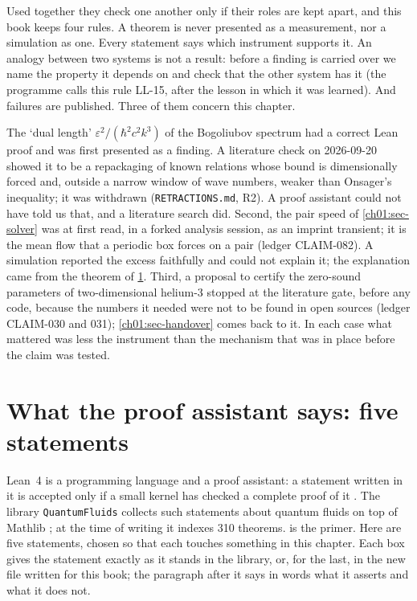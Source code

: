 Used together they check one another only if their roles are kept apart, and this book keeps four rules. A theorem is never presented as a measurement, nor a simulation as one. Every statement says which instrument supports it. An analogy between two systems is not a result: before a finding is carried over we name the property it depends on and check that the other system has it (the programme calls this rule LL-15, after the lesson in which it was learned). And failures are published. Three of them concern this chapter.

The `dual length' $\varepsilon^2/(\hbar^2c^2k^3)$ of the Bogoliubov spectrum had a correct Lean proof and was first presented as a finding. A literature check on 2026-09-20 showed it to be a repackaging of known relations whose bound is dimensionally forced and, outside a narrow window of wave numbers, weaker than Onsager's inequality; it was withdrawn (\texttt{RETRACTIONS.md}, R2). A proof assistant could not have told us that, and a literature search did. Second, the pair speed of \cref{ch01:sec-solver} was at first read, in a forked analysis session, as an imprint transient; it is the mean flow that a periodic box forces on a pair (ledger CLAIM-082). A simulation reported the excess faithfully and could not explain it; the explanation came from the theorem of \cref{ch01:sec-proof}. Third, a proposal to certify the zero-sound parameters of two-dimensional helium-3 stopped at the literature gate, before any code, because the numbers it needed were not to be found in open sources (ledger CLAIM-030 and 031); \cref{ch01:sec-handover} comes back to it. In each case what mattered was less the instrument than the mechanism that was in place before the claim was tested.

\section{What the proof assistant says: five statements}\label{ch01:sec-proof}

Lean~4 is a programming language and a proof assistant: a statement written in it is accepted only if a small kernel has checked a complete proof of it \cite{deMoura2021}. The library \texttt{QuantumFluids} \cite{Callens2026lib} collects such statements about quantum fluids on top of Mathlib \cite{Mathlib2020}; at the time of writing it indexes 310 theorems.  is the primer. Here are five statements, chosen so that each touches something in this chapter. Each box gives the statement exactly as it stands in the library, or, for the last, in the new file written for this book; the paragraph after it says in words what it asserts and what it does not.

